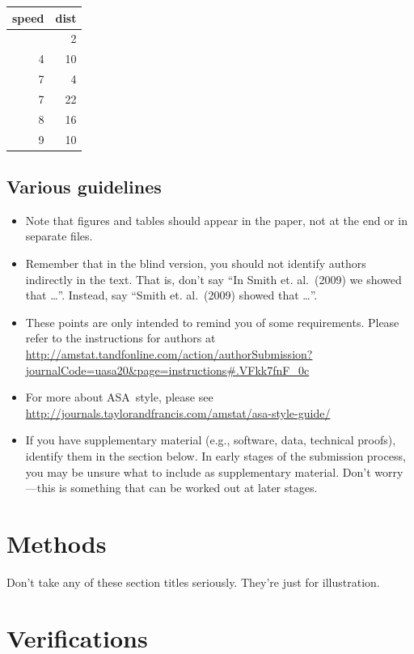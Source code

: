 \documentclass[12pt]{article}
\providecommand{\tightlist}{%
  \setlength{\itemsep}{0pt}\setlength{\parskip}{0pt}}
\begin{document}
\begin{longtable}[]{@{}rr@{}}
\toprule\noalign{}
speed & dist \\
\midrule\noalign{}
\endhead
\bottomrule\noalign{}
\endlastfoot
4 & 2 \\
4 & 10 \\
7 & 4 \\
7 & 22 \\
8 & 16 \\
9 & 10 \\
\end{longtable}

\subsection{Various guidelines}\label{various-guidelines}

\begin{itemize}
\tightlist
\item
  Note that figures and tables should appear in the paper, not at the
  end or in separate files.
\item
  Remember that in the blind version, you should not identify authors
  indirectly in the text. That is, don't say ``In Smith et. al.~(2009)
  we showed that \ldots{}''. Instead, say ``Smith et. al.~(2009) showed
  that \ldots{}''.
\item
  These points are only intended to remind you of some requirements.
  Please refer to the instructions for authors at
  \url{http://amstat.tandfonline.com/action/authorSubmission?journalCode=uasa20&page=instructions\#.VFkk7fnF_0c}
\item
  For more about ASA~style, please see
  \url{http://journals.taylorandfrancis.com/amstat/asa-style-guide/}
\item
  If you have supplementary material (e.g., software, data, technical
  proofs), identify them in the section below. In early stages of the
  submission process, you may be unsure what to include as supplementary
  material. Don't worry---this is something that can be worked out at
  later stages.
\end{itemize}

\section{Methods}\label{meth}

Don't take any of these section titles seriously. They're just for
illustration.

\section{Verifications}\label{verify}
\end{document}
